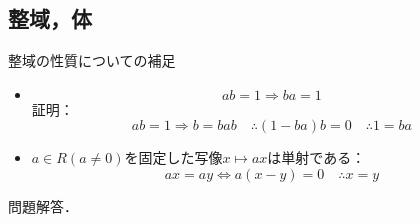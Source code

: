 \documentclass[a4paper,10pt,uplatex]{jsarticle}
\numberwithin{equation}{section}
\theoremstyle{mystyle}
\begin{document}
\subsection{整域，体}
整域の性質についての補足
\begin{itemize}
    \item 
    \begin{equation}
        ab = 1 \Rightarrow ba = 1
    \end{equation}
    証明：
    \begin{equation}
        ab = 1 \Rightarrow b = bab \quad \therefore (1 - ba)b = 0 \quad \therefore 1 = ba
    \end{equation}
    \item $a \in R(a \neq 0)$を固定した写像$x \mapsto ax$は単射である：
    \begin{equation}
        ax = ay \Leftrightarrow a(x - y) = 0 \quad \therefore x = y
    \end{equation}
\end{itemize}
問題解答．
\end{document}
